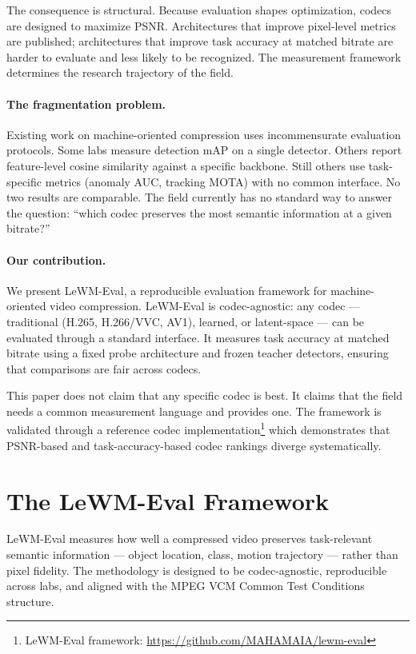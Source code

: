 \documentclass{article}
\begin{document}
The consequence is structural. Because evaluation shapes optimization, codecs are designed to maximize PSNR. Architectures that improve pixel-level metrics are published; architectures that improve task accuracy at matched bitrate are harder to evaluate and less likely to be recognized. The measurement framework determines the research trajectory of the field.

\paragraph{The fragmentation problem.}
Existing work on machine-oriented compression uses incommensurate evaluation protocols. Some labs measure detection mAP on a single detector. Others report feature-level cosine similarity against a specific backbone. Still others use task-specific metrics (anomaly AUC, tracking MOTA) with no common interface. No two results are comparable. The field currently has no standard way to answer the question: ``which codec preserves the most semantic information at a given bitrate?''

\paragraph{Our contribution.}
We present LeWM-Eval, a reproducible evaluation framework for machine-oriented video compression. LeWM-Eval is codec-agnostic: any codec --- traditional (H.265, H.266/VVC, AV1), learned, or latent-space --- can be evaluated through a standard interface. It measures task accuracy at matched bitrate using a fixed probe architecture and frozen teacher detectors, ensuring that comparisons are fair across codecs.

This paper does not claim that any specific codec is best. It claims that the field needs a common measurement language and provides one. The framework is validated through a reference codec implementation\footnote{LeWM-Eval framework: \url{https://github.com/MAHAMAIA/lewm-eval}} which demonstrates that PSNR-based and task-accuracy-based codec rankings diverge systematically.

\section{The LeWM-Eval Framework}
\label{sec:method}

LeWM-Eval measures how well a compressed video preserves task-relevant semantic information --- object location, class, motion trajectory --- rather than pixel fidelity. The methodology is designed to be codec-agnostic, reproducible across labs, and aligned with the MPEG VCM Common Test Conditions structure.
\end{document}
